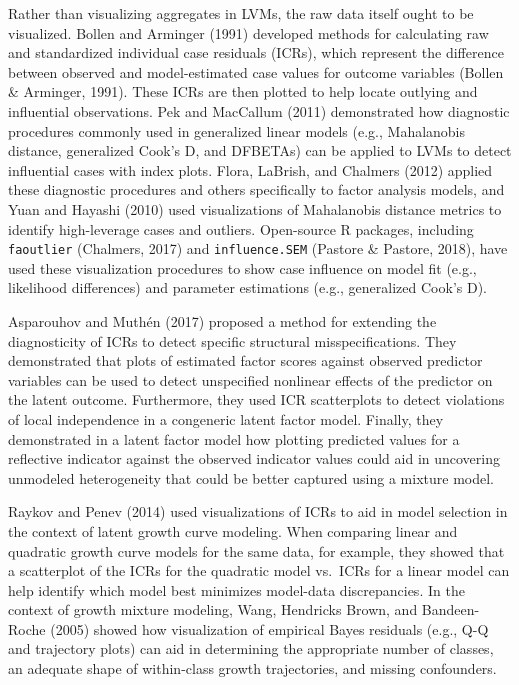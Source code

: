 \documentclass[
  english,
  doc]{apa6}
\begin{document}
Rather than visualizing aggregates in LVMs, the raw data itself ought to be visualized. Bollen and Arminger (1991) developed methods for calculating raw and standardized individual case residuals (ICRs), which represent the difference between observed and model-estimated case values for outcome variables (Bollen \& Arminger, 1991). These ICRs are then plotted to help locate outlying and influential observations. Pek and MacCallum (2011) demonstrated how diagnostic procedures commonly used in generalized linear models (e.g., Mahalanobis distance, generalized Cook's D, and DFBETAs) can be applied to LVMs to detect influential cases with index plots. Flora, LaBrish, and Chalmers (2012) applied these diagnostic procedures and others specifically to factor analysis models, and Yuan and Hayashi (2010) used visualizations of Mahalanobis distance metrics to identify high-leverage cases and outliers. Open-source R packages, including \texttt{faoutlier} (Chalmers, 2017) and \texttt{influence.SEM} (Pastore \& Pastore, 2018), have used these visualization procedures to show case influence on model fit (e.g., likelihood differences) and parameter estimations (e.g., generalized Cook's D).

Asparouhov and Muthén (2017) proposed a method for extending the diagnosticity of ICRs to detect specific structural misspecifications. They demonstrated that plots of estimated factor scores against observed predictor variables can be used to detect unspecified nonlinear effects of the predictor on the latent outcome. Furthermore, they used ICR scatterplots to detect violations of local independence in a congeneric latent factor model. Finally, they demonstrated in a latent factor model how plotting predicted values for a reflective indicator against the observed indicator values could aid in uncovering unmodeled heterogeneity that could be better captured using a mixture model.

Raykov and Penev (2014) used visualizations of ICRs to aid in model selection in the context of latent growth curve modeling. When comparing linear and quadratic growth curve models for the same data, for example, they showed that a scatterplot of the ICRs for the quadratic model vs.~ICRs for a linear model can help identify which model best minimizes model-data discrepancies. In the context of growth mixture modeling, Wang, Hendricks Brown, and Bandeen-Roche (2005) showed how visualization of empirical Bayes residuals (e.g., Q-Q and trajectory plots) can aid in determining the appropriate number of classes, an adequate shape of within-class growth trajectories, and missing confounders.
\end{document}

